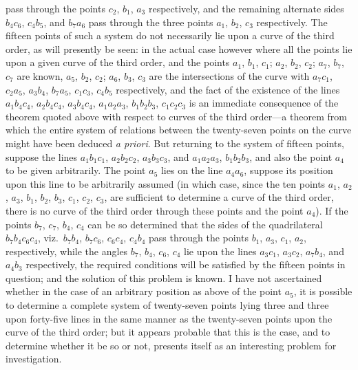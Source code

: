 \documentclass[11pt,a4paper]{book}
\begin{document}
pass through the points $c_{2}$, $b_{1}$, $a_{3}$ respectively, and the remaining alternate sides $b_{4}c_{6}$, $c_{4}b_{5}$, and $b_{7}a_{6}$ pass through the three points $a_{1}$, $b_{2}$, $c_{3}$ respectively. The fifteen points of such a system do not necessarily lie upon a curve of the third order, as will presently be seen: in the actual case however where all the points lie upon a given curve of the third order, and the points $a_{1}$, $b_{1}$, $c_{1}$; $a_{2}$, $b_{2}$, $c_{2}$; $a_{7}$, $b_{7}$, $c_{7}$ are known, $a_{5}$, $b_{2}$, $c_{2}$; $a_{6}$, $b_{3}$, $c_{3}$ are the intersections of the curve with $a_{7}c_{1}$, $c_{2}a_{5}$, $a_{3}b_{4}$, $b_{7}a_{5}$, $c_{1}c_{3}$, $c_{4}b_{5}$ respectively, and the fact of the existence of the lines $a_{1}b_{4}c_{4}$, $a_{2}b_{4}c_{4}$, $a_{3}b_{4}c_{4}$, $a_{1}a_{2}a_{3}$, $b_{1}b_{2}b_{3}$, $c_{1}c_{2}c_{3}$ is an immediate consequence of the theorem quoted above with respect to curves of the third order---a theorem from which the entire system of relations between the twenty-seven points on the curve might have been deduced \textit{a priori}. But returning to the system of fifteen points, suppose the lines $a_{1}b_{1}c_{1}$, $a_{2}b_{2}c_{2}$, $a_{3}b_{3}c_{3}$, and $a_{1}a_{2}a_{3}$, $b_{1}b_{2}b_{3}$, and also the point $a_{4}$ to be given arbitrarily. The point $a_{5}$ lies on the line $a_{4}a_{6}$, suppose its position upon this line to be arbitrarily assumed (in which case, since the ten points $a_{1}$, $a_{2}$, $a_{3}$, $b_{1}$, $b_{2}$, $b_{3}$, $c_{1}$, $c_{2}$, $c_{3}$, are sufficient to determine a curve of the third order, there is no curve of the third order through these points and the point $a_{4}$). If the points $b_{7}$, $c_{7}$, $b_{4}$, $c_{4}$ can be so determined that the sides of the quadrilateral $b_{7}b_{4}c_{6}c_{4}$, viz.\ $b_{7}b_{4}$, $b_{7}c_{6}$, $c_{6}c_{4}$, $c_{4}b_{4}$ pass through the points $b_{1}$, $a_{3}$, $c_{1}$, $a_{2}$, respectively, while the angles $b_{7}$, $b_{4}$, $c_{6}$, $c_{4}$ lie upon the lines $a_{3}c_{1}$, $a_{3}c_{2}$, $a_{7}b_{4}$, and $a_{4}b_{3}$ respectively, the required conditions will be satisfied by the fifteen points in question; and the solution of this problem is known. I have not ascertained whether in the case of an arbitrary position as above of the point $a_{5}$, it is possible to determine a complete system of twenty-seven points lying three and three upon forty-five lines in the same manner as the twenty-seven points upon the curve of the third order; but it appears probable that this is the case, and to determine whether it be so or not, presents itself as an interesting problem for investigation.
\end{document}
